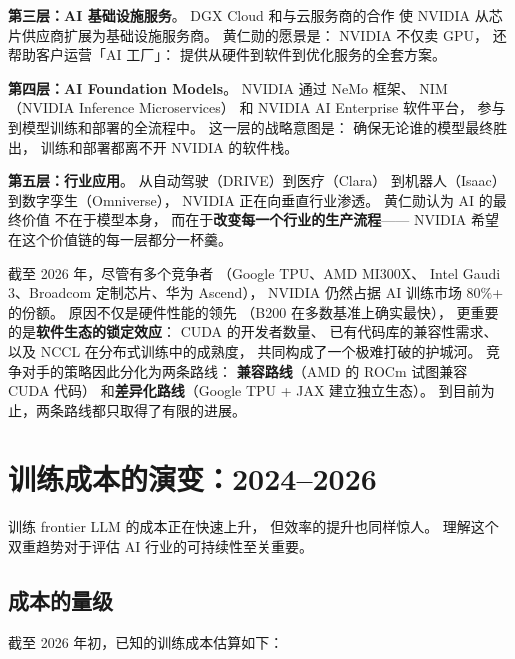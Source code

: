 \textbf{第三层：AI 基础设施服务}。
DGX Cloud 和与云服务商的合作
使 NVIDIA 从芯片供应商扩展为基础设施服务商。
黄仁勋的愿景是：
NVIDIA 不仅卖 GPU，
还帮助客户运营「AI 工厂」：
提供从硬件到软件到优化服务的全套方案。

\textbf{第四层：AI Foundation Models}。
NVIDIA 通过 NeMo 框架、
NIM（NVIDIA Inference Microservices）
和 NVIDIA AI Enterprise 软件平台，
参与到模型训练和部署的全流程中。
这一层的战略意图是：
确保无论谁的模型最终胜出，
训练和部署都离不开 NVIDIA 的软件栈。

\textbf{第五层：行业应用}。
从自动驾驶（DRIVE）到医疗（Clara）
到机器人（Isaac）到数字孪生（Omniverse），
NVIDIA 正在向垂直行业渗透。
黄仁勋认为 AI 的最终价值
不在于模型本身，
而在于\textbf{改变每一个行业的生产流程}——
NVIDIA 希望在这个价值链的每一层都分一杯羹。

\begin{whybox}
截至 2026 年，尽管有多个竞争者
（Google TPU、AMD MI300X、
Intel Gaudi 3、Broadcom 定制芯片、华为 Ascend），
NVIDIA 仍然占据 AI 训练市场 80\%+ 的份额。
原因不仅是硬件性能的领先
（B200 在多数基准上确实最快），
更重要的是\textbf{软件生态的锁定效应}：
CUDA 的开发者数量、
已有代码库的兼容性需求、
以及 NCCL 在分布式训练中的成熟度，
共同构成了一个极难打破的护城河。
竞争对手的策略因此分化为两条路线：
\textbf{兼容路线}（AMD 的 ROCm 试图兼容 CUDA 代码）
和\textbf{差异化路线}（Google TPU + JAX 建立独立生态）。
到目前为止，两条路线都只取得了有限的进展。
\end{whybox}

\section{训练成本的演变：2024--2026}
\label{sec:training-cost}

训练 frontier LLM 的成本正在快速上升，
但效率的提升也同样惊人。
理解这个双重趋势对于评估 AI 行业的可持续性至关重要。

\subsection{成本的量级}

截至 2026 年初，已知的训练成本估算如下：

